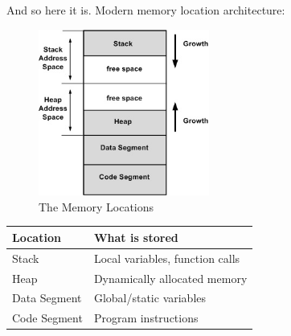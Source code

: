 \documentclass[12pt]{article}
\begin{document}
And so here it is. Modern memory location architecture:

\begin{figure}[htbp]
    \centering
    \includegraphics[width=0.5\textwidth]{memory-locations.jpg}
    \caption{The Memory Locations}
    \label{fig:memory-locations}
\end{figure}

\begin{table}[h!]
\centering
\begin{tabular}{|l|l|}
\hline
\textbf{Location} & \textbf{What is stored} \\
\hline
Stack & Local variables, function calls \\
Heap & Dynamically allocated memory \\
Data Segment & Global/static variables \\
Code Segment & Program instructions \\
\hline
\end{tabular}
\end{table}
\end{document}
